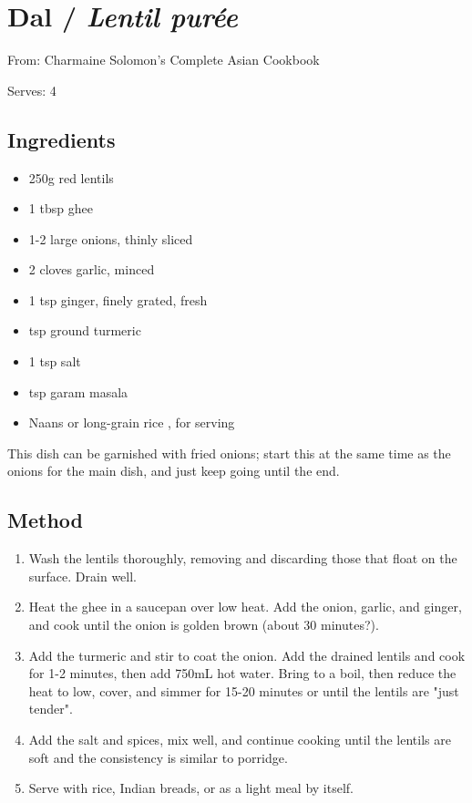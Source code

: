 \section{Dal / \emph{Lentil pur\'{e}e}}


From: Charmaine Solomon's Complete Asian Cookbook

Serves: 4

\subsection{Ingredients}

\begin{itemize}
	\item 250g red lentils
	\item 1 tbsp ghee
	\item 1-2 large onions, thinly sliced
	\item 2 cloves garlic, minced
	\item 1 tsp ginger, finely grated, fresh
	\item {} tsp ground turmeric
	\item 1 tsp salt
	\item {} tsp garam masala
	\item Naans or long-grain rice\clearpage
	, for serving
\end{itemize}

This dish can be garnished with fried onions; start this at the same time as the onions for the main dish, and just keep going until the end.

\subsection{Method}

\begin{enumerate}
	\item Wash the lentils thoroughly, removing and discarding those that float on the surface. Drain well.
	\item Heat the ghee in a saucepan over low heat. Add the onion, garlic, and ginger, and cook until the onion is golden brown (about 30 minutes?).
	\item Add the turmeric and stir to coat the onion. Add the drained lentils and cook for 1-2 minutes, then add 750mL hot water. Bring to a boil, then reduce the heat to low, cover, and simmer for 15-20 minutes or until the lentils are "just tender".
	\item Add the salt and spices, mix well, and continue cooking until the lentils are soft and the consistency is similar to porridge.
	\item Serve with rice, Indian breads, or as a light meal by itself.
\end{enumerate}

